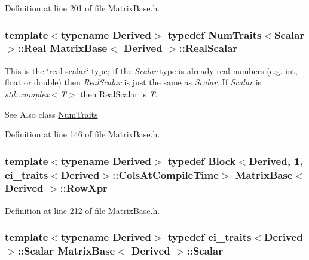 Definition at line 201 of file Matrix\-Base.\-h.

\hypertarget{class_matrix_base_a634804c67de40fec74e3640bc229364c}{
\subsubsection[{Real\-Scalar}]{\setlength{\rightskip}{0pt plus 5cm}template$<$typename Derived$>$ typedef {\bf Num\-Traits}$<${\bf Scalar}$>$\-::Real {\bf Matrix\-Base}$<$ Derived $>$\-::{\bf Real\-Scalar}}}\label{class_matrix_base_a634804c67de40fec74e3640bc229364c}
This is the \char`\"{}real scalar\char`\"{} type; if the {\itshape Scalar} type is already real numbers (e.\-g. int, float or double) then {\itshape Real\-Scalar} is just the same as {\itshape Scalar}. If {\itshape Scalar} is {\itshape std\-::complex$<$\-T$>$} then Real\-Scalar is {\itshape T}.

\begin{DoxySeeAlso}{See Also}
class \hyperlink{struct_num_traits}{Num\-Traits} 
\end{DoxySeeAlso}


Definition at line 146 of file Matrix\-Base.\-h.

\hypertarget{class_matrix_base_a8611a38e5109647fef363441928f4e73}{
\subsubsection[{Row\-Xpr}]{\setlength{\rightskip}{0pt plus 5cm}template$<$typename Derived$>$ typedef {\bf Block}$<$Derived, 1, {\bf ei\-\_\-traits}$<$Derived$>$\-::{\bf Cols\-At\-Compile\-Time}$>$ {\bf Matrix\-Base}$<$ Derived $>$\-::{\bf Row\-Xpr}}}\label{class_matrix_base_a8611a38e5109647fef363441928f4e73}


Definition at line 212 of file Matrix\-Base.\-h.

\hypertarget{class_matrix_base_a625df8339dc2d816cbc0fd66e7dadaf5}{
\subsubsection[{Scalar}]{\setlength{\rightskip}{0pt plus 5cm}template$<$typename Derived$>$ typedef {\bf ei\-\_\-traits}$<$Derived$>$\-::{\bf Scalar} {\bf Matrix\-Base}$<$ Derived $>$\-::{\bf Scalar}}}\label{class_matrix_base_a625df8339dc2d816cbc0fd66e7dadaf5}


